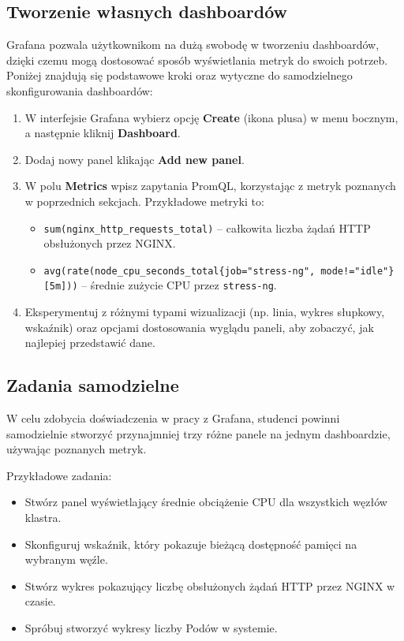 \documentclass{article}
\begin{document}
\subsection{Tworzenie własnych dashboardów}

Grafana pozwala użytkownikom na dużą swobodę w tworzeniu dashboardów, dzięki czemu mogą dostosować sposób wyświetlania metryk do swoich potrzeb. Poniżej znajdują się podstawowe kroki oraz wytyczne do samodzielnego skonfigurowania dashboardów:

\begin{enumerate}
  \item W interfejsie Grafana wybierz opcję \textbf{Create} (ikona plusa) w menu bocznym, a następnie kliknij \textbf{Dashboard}.
  \item Dodaj nowy panel klikając \textbf{Add new panel}.
  \item W polu \textbf{Metrics} wpisz zapytania PromQL, korzystając z metryk poznanych w poprzednich sekcjach. Przykładowe metryki to:
  \begin{itemize}
    \item \texttt{sum(nginx\_http\_requests\_total)} – całkowita liczba żądań HTTP obsłużonych przez NGINX.
    \item \texttt{avg(rate(node\_cpu\_seconds\_total\{job="stress-ng", mode!="idle"\}[5m]))} – średnie zużycie CPU przez \texttt{stress-ng}.
  \end{itemize}
  \item Eksperymentuj z różnymi typami wizualizacji (np. linia, wykres słupkowy, wskaźnik) oraz opcjami dostosowania wyglądu paneli, aby zobaczyć, jak najlepiej przedstawić dane.
\end{enumerate}
\subsection{Zadania samodzielne}

W celu zdobycia doświadczenia w pracy z Grafana, studenci powinni samodzielnie stworzyć przynajmniej trzy różne panele na jednym dashboardzie, używając poznanych metryk. 

Przykładowe zadania:
\begin{itemize}
    \item Stwórz panel wyświetlający średnie obciążenie CPU dla wszystkich węzłów klastra.
    \item Skonfiguruj wskaźnik, który pokazuje bieżącą dostępność pamięci na wybranym węźle.
    \item Stwórz wykres pokazujący liczbę obsłużonych żądań HTTP przez NGINX w czasie.
    \item Spróbuj stworzyć wykresy liczby Podów w systemie.
\end{itemize}
\end{document}
